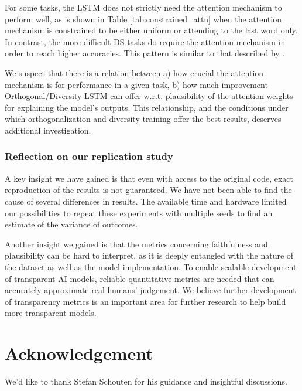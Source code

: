 For some tasks, the LSTM does not strictly need the attention mechanism to perform well, as is shown in Table \ref{tab:constrained_attn} when the attention mechanism is constrained to be either uniform or attending to the last word only. In contrast, the more difficult DS tasks do require the attention mechanism in order to reach higher accuracies. This pattern is similar to that described by \citet{wiegreffe-pinter-2019-attention}. 

We suspect that there is a relation between a) how crucial the attention mechanism is for performance in a given task, b) how much improvement Orthogonal/Diversity LSTM can offer w.r.t. plausibility of the attention weights for explaining the model's outputs. This relationship, and the conditions under which orthogonalization and diversity training offer the best results, deserves additional investigation.

\subsubsection{Reflection on our replication study} A key insight we have gained is that even with access to the original code, exact reproduction of the results is not guaranteed. We have not been able to find the cause of several differences in results. The available time and hardware limited our possibilities to repeat these experiments with multiple seeds to find an estimate of the variance of outcomes. 

Another insight we gained is that the metrics concerning faithfulness and plausibility can be hard to interpret, as it is deeply entangled with the nature of the dataset as well as the model implementation. 
To enable scalable development of transparent AI models, reliable quantitative metrics are needed that can accurately approximate real humans' judgement. 
We believe further development of transparency metrics is an important area for further research to help build more transparent models.

\section*{Acknowledgement}
We'd like to thank Stefan Schouten for his guidance and insightful discussions.





